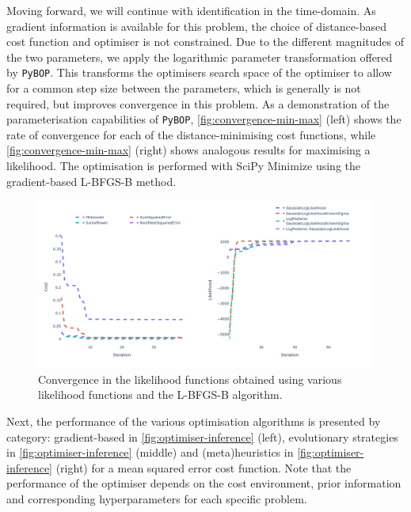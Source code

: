 \documentclass[
]{article}
\begin{document}
Moving forward, we will continue with identification in the time-domain.
As gradient information is available for this problem, the choice of
distance-based cost function and optimiser is not constrained. Due to
the different magnitudes of the two parameters, we apply the logarithmic
parameter transformation offered by \texttt{PyBOP}. This transforms the
optimisers search space of the optimiser to allow for a common step size
between the parameters, which is generally is not required, but improves
convergence in this problem. As a demonstration of the parameterisation
capabilities of \texttt{PyBOP}, \autoref{fig:convergence-min-max} (left)
shows the rate of convergence for each of the distance-minimising cost
functions, while \autoref{fig:convergence-min-max} (right) shows
analogous results for maximising a likelihood. The optimisation is
performed with SciPy Minimize using the gradient-based L-BFGS-B method.

\begin{figure}
\centering
\includegraphics[width=1\textwidth,height=\textheight]{figures/joss/converge.png}
\caption{Convergence in the likelihood functions obtained using various
likelihood functions and the L-BFGS-B algorithm.
\label{fig:convergence-min-max}}
\end{figure}

Next, the performance of the various optimisation algorithms is
presented by category: gradient-based in
\autoref{fig:optimiser-inference} (left), evolutionary strategies in
\autoref{fig:optimiser-inference} (middle) and (meta)heuristics in
\autoref{fig:optimiser-inference} (right) for a mean squared error cost
function. Note that the performance of the optimiser depends on the cost
environment, prior information and corresponding hyperparameters for
each specific problem.
\end{document}
